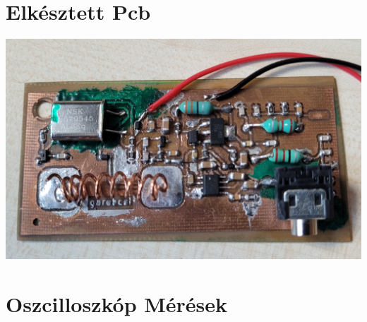 \documentclass[11pt, letterpaper, openany, oneside]{article}
\begin{document}
\section{Elkésztett Pcb}

\includegraphics[width=\linewidth]{img/irl.jpg}

\section{Oszcilloszkóp Mérések}
\end{document}
